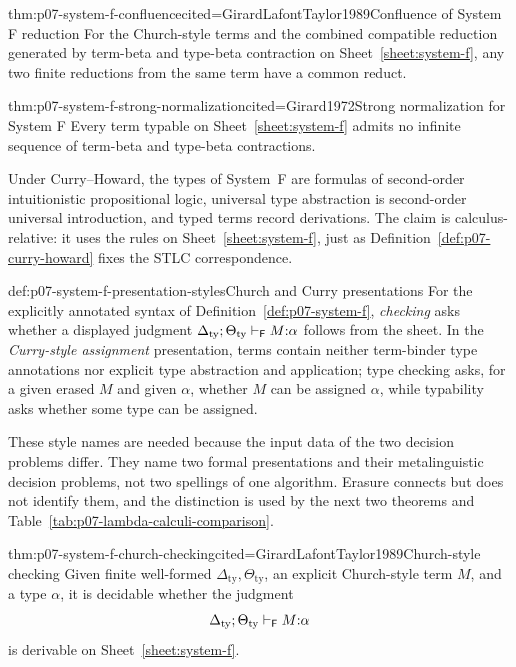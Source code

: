 \begin{hbtheorem}{thm:p07-system-f-confluence}{cited=GirardLafontTaylor1989}{Confluence of System F reduction}
For the Church-style terms and the combined compatible reduction generated by
term-beta and type-beta contraction on Sheet~\ref{sheet:system-f}, any two
finite reductions from the same term have a common reduct.
\end{hbtheorem}

\begin{hbtheorem}{thm:p07-system-f-strong-normalization}{cited=Girard1972}{Strong normalization for System F}
Every term typable on Sheet~\ref{sheet:system-f} admits no infinite sequence
of term-beta and type-beta contractions.
\end{hbtheorem}

Under Curry--Howard, the types of System~F are formulas of second-order
intuitionistic propositional logic, universal type abstraction is
second-order universal introduction, and typed terms record derivations.  The
claim is calculus-relative: it uses the rules on Sheet~\ref{sheet:system-f},
just as Definition~\ref{def:p07-curry-howard} fixes the STLC correspondence.

\begin{hbdefinition}{def:p07-system-f-presentation-styles}{Church and Curry presentations}
For the explicitly annotated syntax of Definition~\ref{def:p07-system-f},
\emph{checking} asks whether a displayed judgment
\(\Delta_{\mathrm{ty}};\Theta_{\mathrm{ty}}\vdash_{\mathsf F}M{:}\alpha\) follows from
the sheet.  In the \emph{Curry-style assignment} presentation, terms contain
neither term-binder type annotations nor explicit type abstraction and
application; type checking asks, for a given erased \(M\) and given
\(\alpha\), whether \(M\) can be assigned \(\alpha\), while typability asks
whether some type can be assigned.

These style names are needed because the input data of the two decision
problems differ.  They name two formal presentations and their metalinguistic
decision problems, not two spellings of one algorithm.  Erasure connects but
does not identify them, and the distinction is used by the next two theorems
and Table~\ref{tab:p07-lambda-calculi-comparison}.
\end{hbdefinition}

\begin{hbtheorem}{thm:p07-system-f-church-checking}{cited=GirardLafontTaylor1989}{Church-style checking}
Given finite well-formed \(\Delta_{\mathrm{ty}},\Theta_{\mathrm{ty}}\), an
explicit Church-style term \(M\), and a type \(\alpha\), it is decidable
whether the judgment
\[
 \Delta_{\mathrm{ty}};\Theta_{\mathrm{ty}}
 \vdash_{\mathsf F}M{:}\alpha
\]
is derivable on Sheet~\ref{sheet:system-f}.
\end{hbtheorem}

